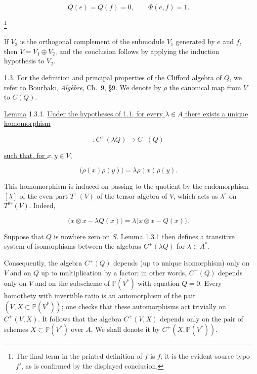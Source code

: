 \begin{equation*}
Q(e)=Q(f)=0,\qquad \Phi(e,f)=1.
\end{equation*}

\footnote{The final term in the printed definition of $f$ is $f$; it is
the evident source typo $f'$, as is confirmed by the displayed
conclusion.}

If $V_2$ is the orthogonal complement of the submodule $V_1$ generated
by $e$ and $f$, then $V=V_1\oplus V_2$, and the conclusion follows by
applying the induction hypothesis to $V_2$.

1.3. For the definition and principal properties of the Clifford algebra
of $Q$, we refer to Bourbaki, \emph{Algèbre}, Ch.~9, \S9.  We denote by
$\rho$ the canonical map from $V$ to $C(Q)$.

\underline{Lemma} 1.3.1. \underline{Under the hypotheses of 1.1, for
every $\lambda\in A$ there exists a unique homomorphism}

\begin{equation*}
[\lambda]\colon C^+(\lambda Q)\longrightarrow C^+(Q)
\end{equation*}

\underline{such that, for $x,y\in V$,}

\begin{equation*}
[\lambda]\bigl(\rho(x)\rho(y)\bigr)
=\lambda\rho(x)\rho(y).
\end{equation*}


This homomorphism is induced on passing to the quotient by the
endomorphism $[\lambda]$ of the even part $T^+(V)$ of the tensor algebra
of $V$, which acts as $\lambda^r$ on $T^{2r}(V)$.  Indeed,

\begin{equation*}
[\lambda]\bigl(x\otimes x-\lambda Q(x)\bigr)
=\lambda\bigl(x\otimes x-Q(x)\bigr).
\end{equation*}

Suppose that $Q$ is nowhere zero on $S$.  Lemma 1.3.1 then defines a
transitive system of isomorphisms between the algebras $C^+(\lambda Q)$
for $\lambda\in A^*$.

Consequently, the algebra $C^+(Q)$ depends (up to unique isomorphism)
only on $V$ and on $Q$ up to multiplication by a factor; in other words,
$C^+(Q)$ depends only on $V$ and on the subscheme of $\mathbb P(V^*)$
with equation $Q=0$.  Every homothety with invertible ratio is an
automorphism of the pair $(V,X\subset\mathbb P(V^*))$; one checks that
these automorphisms act trivially on $C^+(V,X)$.  It follows that the
algebra $C^+(V,X)$ depends only on the pair of schemes
$X\subset\mathbb P(V^*)$ over $A$.  We shall denote it by
$C^+(X,\mathbb P(V^*))$.
